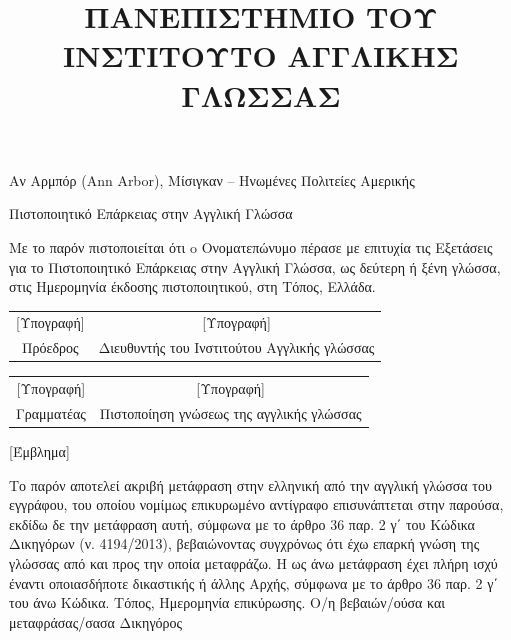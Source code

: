 \documentclass{article}
\title{ΠΑΝΕΠΙΣΤΗΜΙΟ ΤΟΥ \tl{MICHIGAN} ΙΝΣΤΙΤΟΥΤΟ ΑΓΓΛΙΚΗΣ ΓΛΩΣΣΑΣ}
\def\tl{\textlatin}
\begin{document}
\date{} %
\author{} %
\maketitle
Αν Αρμπόρ (\tl{Ann Arbor}), Μίσιγκαν – Ηνωμένες Πολιτείες Αμερικής\\
\begin{center}
    Πιστοποιητικό Επάρκειας στην Αγγλική Γλώσσα
\end{center} 
Με το παρόν πιστοποιείται ότι o Ονοματεπώνυμο πέρασε με επιτυχία τις Εξετάσεις για το Πιστοποιητικό Επάρκειας στην Αγγλική Γλώσσα, ως δεύτερη ή ξένη γλώσσα, στις Ημερομηνία έκδοσης πιστοποιητικού, στη Τόπος, Ελλάδα. \\
\begin{center}
\begin{tabular}{ c c }
 [Υπογραφή] & [Υπογραφή]  \\ 
 Πρόεδρος &  Διευθυντής του Ινστιτούτου Αγγλικής γλώσσας \\  
\end{tabular}
\end{center}    
\begin{center}
\begin{tabular}{ c c }
 [Υπογραφή] & [Υπογραφή]  \\ 
Γραμματέας & Πιστοποίηση γνώσεως της αγγλικής γλώσσας\\  
\end{tabular}
\end{center}    
\begin{center}
    [Έμβλημα]
\end{center} 
Το παρόν αποτελεί ακριβή μετάφραση στην ελληνική από την αγγλική γλώσσα του εγγράφου, του οποίου νομίμως επικυρωμένο αντίγραφο επισυνάπτεται στην παρούσα, εκδίδω δε την μετάφραση αυτή, σύμφωνα με το άρθρο 36 παρ. 2 γ΄ του Κώδικα Δικηγόρων (ν. 4194/2013), βεβαιώνοντας συγχρόνως ότι έχω επαρκή γνώση της γλώσσας από και προς την οποία μεταφράζω. Η ως άνω μετάφραση έχει πλήρη ισχύ έναντι οποιασδήποτε δικαστικής ή άλλης Αρχής, σύμφωνα με το άρθρο 36 παρ. 2 γ΄ του άνω Κώδικα. Τόπος, Ημερομηνία επικύρωσης. Ο/η βεβαιών/ούσα και μεταφράσας/σασα Δικηγόρος
\end{document}
